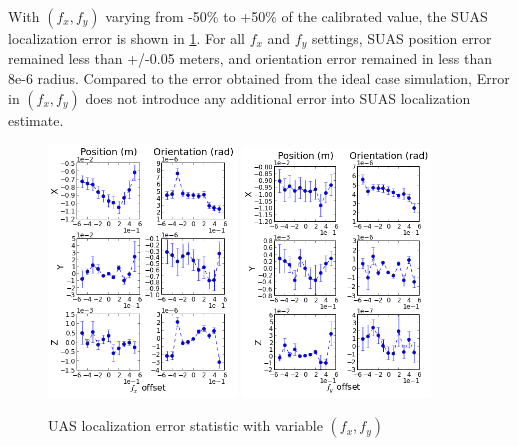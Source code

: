 With $(f_x, f_y)$ varying from -50\% to +50\% of the calibrated
value, the SUAS localization error is shown in \ref{fig:simfig43-44}.
For all $f_x$ and $f_y$ settings, SUAS position error remained less than
+/-0.05 meters, and orientation error remained in less than 8e-6
radius. Compared to the error obtained from the ideal case simulation,
Error in $(f_x, f_y)$ does not introduce any additional error into
SUAS localization estimate. 
\begin{figure}[h]
  \centering
  \includegraphics[width=5cm,keepaspectratio=true]{./Figures/SimulationFigures/Figure43.png}
  \includegraphics[width=5cm,keepaspectratio=true]{./Figures/SimulationFigures/Figure44.png}
  \caption{UAS localization error statistic with variable $(f_x, f_y)$}
  \label{fig:simfig43-44}
\end{figure}

